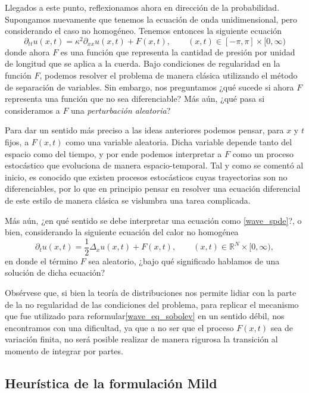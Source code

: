 \documentclass[letterpaper,twoside,12pt]{book}
\newcommand{\R}{\mathbb{R}}
\newcommand{\1}{\mathds{1}}
\theoremstyle{definition}
\theoremstyle{definition}
\theoremstyle{definition}
\theoremstyle{definition}
\theoremstyle{definition}
\theoremstyle{definition}
\theoremstyle{definition}
\begin{document}
Llegados a este punto, reflexionamos ahora en dirección de la probabilidad. Supongamos nuevamente que tenemos la ecuación de onda unidimensional, pero considerando el caso no homogéneo. Tenemos entonces la siguiente ecuación
\begin{equation}\label{wave_spde}
\partial_{tt}u(x,t)=\kappa^2\partial_{xx}u(x,t)+F(x,t), \qquad (x,t)\in [-\pi,\pi]\times[0,\infty)
\end{equation}
donde ahora $F$ es una función que representa la cantidad de presión por unidad de longitud que se aplica a la cuerda. Bajo condiciones de regularidad en la función $F$, podemos resolver el problema de manera clásica utilizando el método de separación de variables. Sin embargo, nos preguntamos ¿qué sucede si ahora $F$ representa una función que no sea diferenciable? Más aún, ¿qué pasa si consideramos a $F$ una \textit{perturbación aleatoria}?

Para dar un sentido más preciso a las ideas anteriores podemos pensar, para $x$ y $t$ fijos, a $F(x,t)$ como una variable aleatoria. Dicha variable depende tanto del espacio como del tiempo, y por ende podemos interpretar a $F$ como un proceso estocástico que evoluciona de manera espacio-temporal. Tal y como se comentó al inicio, es conocido que existen procesos estocásticos cuyas trayectorias son no diferenciables, por lo que en principio pensar en resolver una ecuación diferencial de este estilo de manera clásica se vislumbra una tarea complicada.

Más aún, ¿en qué sentido se debe interpretar una ecuación como \eqref{wave_spde}?, o bien, considerando la siguiente ecuación del calor no homogénea 
\begin{equation}\label{heat_spde}
    \partial_t{u(x,t)}=\frac{1}{2}\Delta_{x}u(x,t)+F(x,t), \qquad (x,t)\in \R^{N}\times[0,\infty),
\end{equation}
en donde el término $F$ sea aleatorio, ¿bajo qué significado hablamos de una solución de dicha ecuación?

Obsérvese que, si bien la teoría de distribuciones nos permite lidiar con la parte de la no regularidad de las condiciones del problema, para replicar el mecanismo que fue utilizado para reformular\eqref{wave_eq_sobolev} en un sentido débil, nos encontramos con una dificultad, ya que a no ser que el proceso $F(x,t)$ sea de variación finita, no será posible realizar de manera rigurosa la transición al momento de integrar por partes.

\subsection{Heurística de la formulación Mild}
\end{document}

